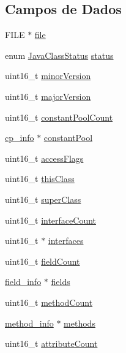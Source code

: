 \subsection*{Campos de Dados}
\begin{DoxyCompactItemize}
\item 
F\+I\+LE $\ast$ \hyperlink{structJavaClass_a24301fe0d812773595ca16c4ee658318}{file}
\item 
enum \hyperlink{javaclass_8h_a9b332e6330d199c30e246d4ad8bff5ac}{Java\+Class\+Status} \hyperlink{structJavaClass_aba868ba95744ed4200bd5bba1ad31ffc}{status}
\item 
uint16\+\_\+t \hyperlink{structJavaClass_a3961e984041068a78fa5b45414a94a00}{minor\+Version}
\item 
uint16\+\_\+t \hyperlink{structJavaClass_a7e6bc5cab0ffc5091e940cdb3b63e4eb}{major\+Version}
\item 
uint16\+\_\+t \hyperlink{structJavaClass_a89731a6218fb65b228ee1e056c368628}{constant\+Pool\+Count}
\item 
\hyperlink{structcp__info}{cp\+\_\+info} $\ast$ \hyperlink{structJavaClass_ad56dc000ce07c5c6ef57a1ef6f4859e0}{constant\+Pool}
\item 
uint16\+\_\+t \hyperlink{structJavaClass_a305af686b39aafe8248cb4b5af0f5ad4}{access\+Flags}
\item 
uint16\+\_\+t \hyperlink{structJavaClass_ac9af41263ddeabcfafd6464fd82c736f}{this\+Class}
\item 
uint16\+\_\+t \hyperlink{structJavaClass_a08240a259178c4576a82c688f4d3f8a8}{super\+Class}
\item 
uint16\+\_\+t \hyperlink{structJavaClass_a0abfb912729bc17c129e5460ae02dcd3}{interface\+Count}
\item 
uint16\+\_\+t $\ast$ \hyperlink{structJavaClass_a582289dae1229db46bbb8d733edf6a0a}{interfaces}
\item 
uint16\+\_\+t \hyperlink{structJavaClass_ac1568f2faaa136f0877d8a2962c00626}{field\+Count}
\item 
\hyperlink{structfield__info}{field\+\_\+info} $\ast$ \hyperlink{structJavaClass_a84f183bb9d29d499a5e910b9041acd14}{fields}
\item 
uint16\+\_\+t \hyperlink{structJavaClass_a4451678a1ac1921ddb929aced262d1d9}{method\+Count}
\item 
\hyperlink{structmethod__info}{method\+\_\+info} $\ast$ \hyperlink{structJavaClass_ab923c8f31c71ce1602ca21576a48bcb8}{methods}
\item 
uint16\+\_\+t \hyperlink{structJavaClass_ad04e4bd9744078e4f1f739f51295480e}{attribute\+Count}

\end{DoxyCompactItemize}
